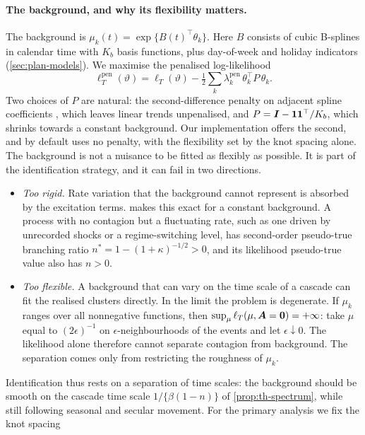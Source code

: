 \paragraph{The background, and why its flexibility matters.} The background is
$\mu_k(t)=\exp\{B(t)^{\top}\theta_k\}$. Here $B$ consists of cubic B-splines in calendar
time with $K_b$ basis functions, plus day-of-week and holiday indicators
(\cref{sec:plan-models}). We maximise the penalised log-likelihood
\begin{equation}\label{eq:est-pen}
  \ell^{\mathrm{pen}}_T(\vartheta)=\ell_T(\vartheta)-\tfrac12\sum_{k}\lambda^{\mathrm{pen}}_k\,
  \theta_k^{\top}P\,\theta_k .
\end{equation}
Two choices of $P$ are natural: the second-difference penalty on adjacent spline
coefficients \citep{eilers1996}, which leaves linear trends unpenalised, and
$P=\bm{I}-\mathbf 1\mathbf 1^{\top}/K_b$, which shrinks towards a constant background. Our
implementation offers the second, and by default uses no penalty, with the flexibility set
by the knot spacing alone. The background is not a nuisance to be fitted as flexibly as
possible. It is part of the identification strategy, and it can fail in two directions.
\begin{itemize}
  \item \emph{Too rigid.} Rate variation that the background cannot represent is absorbed
    by the excitation terms.  makes this exact for a constant
    background. A process with no contagion but a fluctuating rate, such as one driven by
    unrecorded shocks or a regime-switching level, has second-order pseudo-true branching
    ratio $n^*=1-(1+\kappa)^{-1/2}>0$, and its likelihood pseudo-true value also has $n>0$.
  \item \emph{Too flexible.} A background that can vary on the time scale of a cascade can
    fit the realised clusters directly. In the limit the problem is degenerate. If $\mu_k$
    ranges over all nonnegative functions, then
    $\sup_{\mu}\ell_T(\mu,\bm{A}=\mathbf{0})=+\infty$: take $\mu$ equal to $(2\epsilon)^{-1}$ on
    $\epsilon$-neighbourhoods of the events and let $\epsilon\downarrow0$. The likelihood alone
    therefore cannot separate contagion from background. The separation comes only from
    restricting the roughness of $\mu_k$.
\end{itemize}
Identification thus rests on a separation of time scales: the background should be smooth
on the cascade time scale $1/\{\beta(1-n)\}$ of \cref{prop:th-spectrum}, while still
following seasonal and secular movement. For the primary analysis we fix the knot spacing
